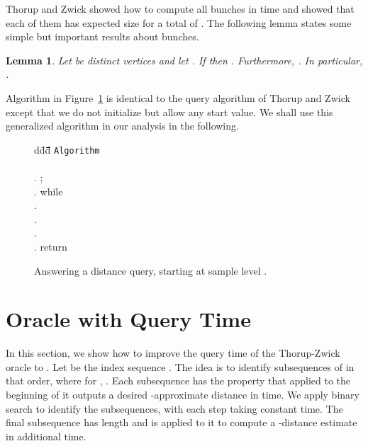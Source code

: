 \documentclass[11pt]{article}
\newtheorem{Lem}{Lemma}
\begin{document}
Thorup and Zwick showed how to compute all bunches in  time and showed that each of them has expected size
 for a total of . The following lemma states some simple but important results about bunches.
\begin{Lem}\label{Lem:SimpleProperties}
Let  be distinct vertices and let . If  then .
Furthermore, . In particular, .
\end{Lem}
Algorithm  in Figure~\ref{fig:Distk} is identical to the query algorithm of Thorup and Zwick except that we do not
initialize  but allow any start value. We shall use this generalized algorithm in our analysis in the following.
\begin{figure}
\begin{tabbing}
d\=dd\=\quad\=\quad\=\quad\=\quad\=\quad\=\quad\=\quad\=\quad\=\quad\=\quad\=\quad\=\kill
\>\texttt{Algorithm} \\\\
. \>; \\
. \>while \\
. \>\>\\
. \>\>\\
. \>\>\\
. \>return 
\end{tabbing}
\caption{Answering a distance query, starting at sample level .}\label{fig:Distk}
\end{figure}



\section{Oracle with  Query Time}\label{sec:FasterQuery}
In this section, we show how to improve the  query time of the Thorup-Zwick oracle to . Let  be the
index sequence . The idea is to identify  subsequences
 of  in that order, where for
,
. Each subsequence  has the property that  applied to the
beginning of it outputs a desired -approximate distance in  time.
We apply binary search to identify the subsequences, with each step taking constant time. The final
subsequence  has  length and  is applied to it to compute a -distance estimate in 
additional time.
\end{document}
